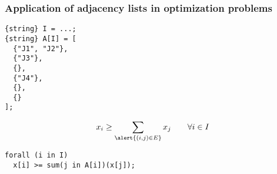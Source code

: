 \begin{frame}[fragile]
 \frametitle{Application of adjacency lists in optimization problems}
 \bigskip
\begin{lstlisting}[numbers=none,basicstyle=\scriptsize\ttfamily]
{string} I = ...;
{string} A[I] = [
  {"J1", "J2"},
  {"J3"},
  {},
  {"J4"},
  {},
  {}
];
\end{lstlisting}
\vspace{-\baselineskip}
\[
  x_i \geq \sum_{\alert{(i, j) \in E}}x_j\qquad\forall i\in I  
\]
\begin{center}
\end{center}
\begin{lstlisting}[numbers=none]
forall (i in I)
  x[i] >= sum(j in A[i])(x[j]);
\end{lstlisting}
\end{frame}


